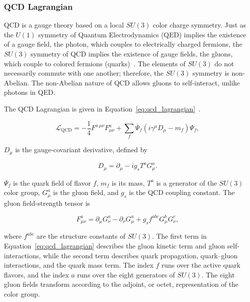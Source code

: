 \subsubsection{QCD Lagrangian}
QCD is a gauge theory based on a local $SU(3)$ color charge symmetry.
Just as the $U(1)$ symmetry of Quantum Electrodynamics (QED) implies the existence of a gauge field, the photon, which couples to electrically charged fermions, the $SU(3)$ symmetry of QCD implies the existence of gauge fields, the gluons, which couple to colored fermions (quarks)~\cite{thomsonqft}.
The elements of $SU(3)$ do not necessarily commute with one another; therefore, the $SU(3)$ symmetry is non-Abelian.
The non-Abelian nature of QCD allows gluons to self-interact, unlike photons in QED.

The QCD Lagrangian is given in Equation~\ref{eq:qcd_lagrangian}~\cite{peskinqcd}.

\begin{equation}
    \label{eq:qcd_lagrangian}
    \mathcal{L}_{\mathrm{QCD}} = -\frac{1}{4}F^{a\,\mu\nu}F^a_{\mu\nu}
    +\sum_f \overline{\Psi}_f\left(i \gamma^\mu D_\mu - m_f\right)\Psi_f,
\end{equation}

$D_\mu$ is the gauge-covariant derivative, defined by

\begin{equation}
    \label{eq:qcd_covariant_derivative}
    D_\mu = \partial_\mu - ig_sT^aG^a_\mu.
\end{equation}

$\Psi_f$ is the quark field of flavor $f$, $m_f$ is its mass, $T^a$ is a generator of the $SU(3)$ color group, $G^a_\mu$ is the gluon field, and $g_s$ is the QCD coupling constant. The gluon field-strength tensor is

\begin{equation}
    \label{eq:qcd_field_strength}
    F^a_{\mu\nu} = \partial_\mu G^a_\nu - \partial_\nu G^a_\mu + g_sf^{abc}G^b_\mu G^c_\nu,
\end{equation}

where $f^{abc}$ are the structure constants of $SU(3)$. The first term in Equation~\ref{eq:qcd_lagrangian} describes the gluon kinetic term and gluon self-interactions, while the second term describes quark propagation, quark--gluon interactions, and the quark mass term. The index $f$ runs over the active quark flavors, and the index $a$ runs over the eight generators of $SU(3)$. The eight gluon fields transform according to the adjoint, or octet, representation of the color group.
\FloatBarrier

